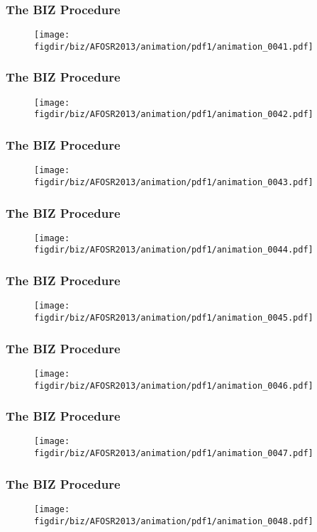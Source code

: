 \documentclass[13pt]{beamer}
\newcommand{\figdir}{../../fig}
\begin{document}
{\begin{frame}\frametitle{The BIZ Procedure}\begin{figure}\texttt{[image: \\figdir/biz/AFOSR2013/animation/pdf1/animation\_0041.pdf]}\end{figure}\end{frame}
\begin{frame}\frametitle{The BIZ Procedure}\begin{figure}\texttt{[image: \\figdir/biz/AFOSR2013/animation/pdf1/animation\_0042.pdf]}\end{figure}\end{frame}
\begin{frame}\frametitle{The BIZ Procedure}\begin{figure}\texttt{[image: \\figdir/biz/AFOSR2013/animation/pdf1/animation\_0043.pdf]}\end{figure}\end{frame}
\begin{frame}\frametitle{The BIZ Procedure}\begin{figure}\texttt{[image: \\figdir/biz/AFOSR2013/animation/pdf1/animation\_0044.pdf]}\end{figure}\end{frame}
\begin{frame}\frametitle{The BIZ Procedure}\begin{figure}\texttt{[image: \\figdir/biz/AFOSR2013/animation/pdf1/animation\_0045.pdf]}\end{figure}\end{frame}
\begin{frame}\frametitle{The BIZ Procedure}\begin{figure}\texttt{[image: \\figdir/biz/AFOSR2013/animation/pdf1/animation\_0046.pdf]}\end{figure}\end{frame}
\begin{frame}\frametitle{The BIZ Procedure}\begin{figure}\texttt{[image: \\figdir/biz/AFOSR2013/animation/pdf1/animation\_0047.pdf]}\end{figure}\end{frame}
\begin{frame}\frametitle{The BIZ Procedure}\begin{figure}\texttt{[image: \\figdir/biz/AFOSR2013/animation/pdf1/animation\_0048.pdf]}\end{figure}\end{frame}
}
\end{document}
